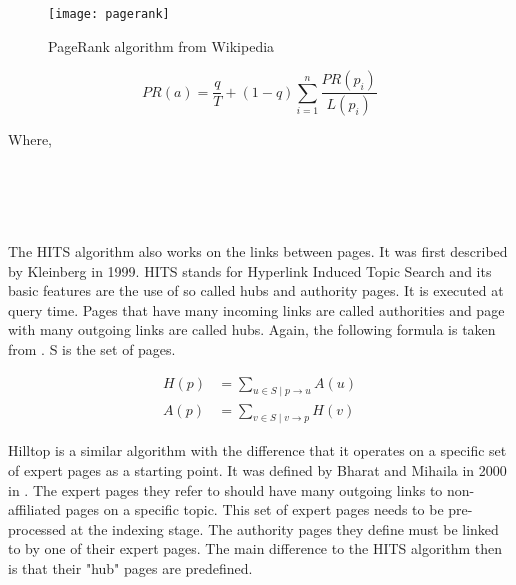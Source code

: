 \begin{figure}[htb] %
  \centering
  \texttt{[image: pagerank]}
\caption[PageRank algorithm]{PageRank algorithm from Wikipedia}
\label{fig:pagerank}
\end{figure}

\begin{equation}
  PR(a) =
  \frac{q}{T} + (1 - q)
  \sum_{i=1}^{n} \frac{PR(p_i)}{L(p_i)}
  \label{eq:PR}
\end{equation}

Where,\\
 \\
 \\
 \\
 \\
\itab{} 

The HITS algorithm also works on the links between pages. It was first described by Kleinberg \citep[p.472]{Kleinberg1999, Kleinberg} in 1999. HITS stands for Hyperlink Induced Topic Search and its basic features are the use of so called hubs and authority pages. It is executed at query time. Pages that have many incoming links are called authorities and page with many outgoing links are called hubs. Again, the following formula is taken from \citep[p.471]{Baeza-Yates2011}. S is the set of pages.

\begin{equation}
  \begin{split}
  H(p) &= \sum_{u\in S \mid p\to u}A(u)\\
  A(p) &= \sum_{v\in S \mid v\to p}H(v)
  \end{split}
  \label{eq:HITS}
\end{equation}

Hilltop is a similar algorithm with the difference that it operates on a specific set of expert pages as a starting point. It was defined by Bharat and Mihaila in 2000 in \citep{Bharat2000}. The expert pages they refer to should have many outgoing links to non-affiliated pages on a specific topic. This set of expert pages needs to be pre-processed at the indexing stage. The authority pages they define must be linked to by one of their expert pages. The main difference to the HITS algorithm then is that their "hub" pages are predefined.

